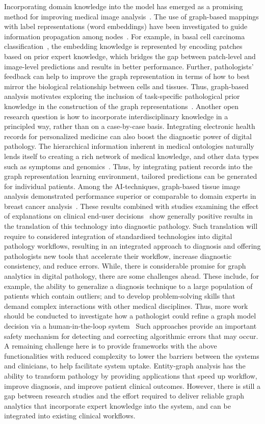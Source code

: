 Incorporating domain knowledge into the model has emerged as a promising method for improving medical image analysis~. 
The use of graph-based mappings with label representations (word embeddings) have been investigated to guide information propagation among nodes~. For example, in basal cell carcinoma classification{~}, the embedding knowledge is represented by encoding patches based on prior expert knowledge, which bridges the gap between patch-level and image-level predictions and results in better performance.
Further, pathologists' feedback can help to improve the graph representation in terms of how to best mirror the biological relationship between cells and tissues. Thus, graph-based analysis motivates exploring the inclusion of task-specific pathological prior knowledge in the construction of the graph representations~.
Another open research question is how to incorporate interdisciplinary knowledge in a principled way, rather than on a case-by-case basis.
Integrating electronic health records for personalized medicine can also boost the diagnostic power of digital pathology. The hierarchical information inherent in medical ontologies naturally lends itself to creating a rich network of medical knowledge, and other data types such as symptoms and genomics~. Thus, by integrating patient records into the graph representation learning environment, tailored predictions can be generated for individual patients.
Among the AI-techniques, graph-based tissue image analysis demonstrated performance superior or comparable to domain experts in breast cancer analysis{~}.
These results combined with studies examining the effect of explanations on clinical end-user decisions{~} show generally positive results in the translation of this technology into diagnostic pathology.
Such translation will require to considered integration of standardised technologies into digital pathology workflows, resulting in an integrated approach to diagnosis and offering pathologists new tools that accelerate their workflow, increase diagnostic consistency, and reduce errors.
While, there is considerable promise for graph analytics in digital pathology, there are some challenges ahead.
These include, for example, the ability to generalize a diagnosis technique to a large population of patients which contain outliers; and to develop problem-solving skills that demand complex interactions with other medical disciplines.
Thus, more work should be conducted to investigate how a pathologist could refine a graph model decision via a human-in-the-loop system~
Such approaches provide an important safety mechanism for detecting and correcting algorithmic errors that may occur.
A remaining challenge here is to provide frameworks with the above functionalities with reduced complexity to lower the barriers  between the systems and clinicians, to help facilitate system uptake.
Entity-graph analysis has the ability to transform pathology by providing applications that speed up workflow, improve diagnosis, and improve patient clinical outcomes. However, there is still a gap between research studies and the effort required to deliver reliable graph analytics that incorporate expert knowledge into the system, and can be integrated into existing clinical workflows.
\vspace{-6pt}

